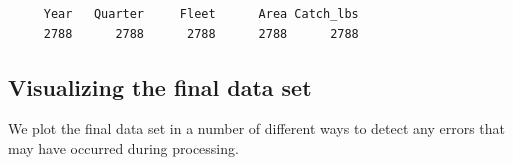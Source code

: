 \documentclass[
]{article}
\newenvironment{Shaded}{\begin{snugshade}}{\end{snugshade}}
\newcommand{\AttributeTok}[1]{\textcolor[rgb]{0.40,0.45,0.13}{#1}}
\newcommand{\CommentTok}[1]{\textcolor[rgb]{0.37,0.37,0.37}{#1}}
\newcommand{\FunctionTok}[1]{\textcolor[rgb]{0.28,0.35,0.67}{#1}}
\newcommand{\NormalTok}[1]{\textcolor[rgb]{0.00,0.23,0.31}{#1}}
\newcommand{\OtherTok}[1]{\textcolor[rgb]{0.00,0.23,0.31}{#1}}
\newcommand{\SpecialCharTok}[1]{\textcolor[rgb]{0.37,0.37,0.37}{#1}}
\newcommand{\StringTok}[1]{\textcolor[rgb]{0.13,0.47,0.30}{#1}}
\begin{document}
\begin{verbatim}
     Year   Quarter     Fleet      Area Catch_lbs 
     2788      2788      2788      2788      2788 
\end{verbatim}

\begin{Shaded}
\end{Shaded}

\subsection{Visualizing the final data
set}\label{visualizing-the-final-data-set}

We plot the final data set in a number of different ways to detect any
errors that may have occurred during processing.
\end{document}
